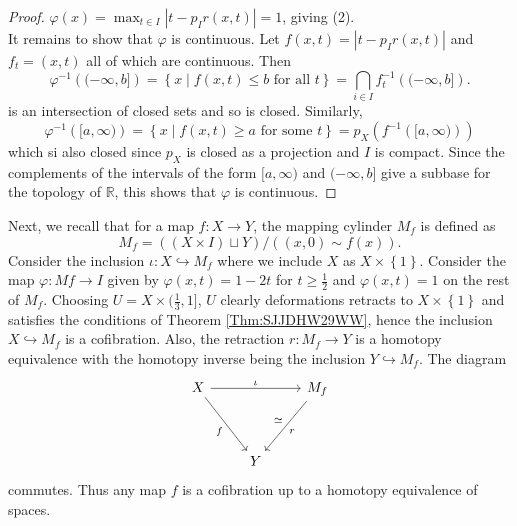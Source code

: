 \begin{proof}
    $\varphi (x) = 
    \max_{t \in I} \left| t - p_I r(x,t) \right| = 1$, giving
    (2).\\
    It remains to show that $\varphi $ is continuous.
    Let $f(x,t) = \left| t - p_I r(x,t) \right| $ and
    $f_t = (x,t)$ all of which are continuous.
    Then
    \[
        \varphi^{-1} \left( (- \infty, b] \right) 
        = \left\{ x  \mid f(x,t) \le b \text{ for all }t 
        \right\} = 
        \bigcap_{i \in  I} f_t^{-1}\left( (- \infty, b] \right) .
    \]
    is an intersection of closed sets and so is closed.
    Similarly,
    \[
    \varphi^{-1} \left( [a, \infty) \right) 
    = \left\{ x  \mid  f(x,t) \ge a \text{ for some }t \right\} 
    = p_X \left( f^{-1} \left( [a, \infty) \right)  \right) 
    \] 
    which si also closed since $p_X$ is closed as
    a projection and
    $I$ is compact.
    Since the complements of the intervals of the
    form $[a, \infty)$ and 
    $(-\infty, b]$ give a subbase for the topology of
    $\mathbb{R}$, this shows that
    $\varphi $ is continuous.





\end{proof}


Next, we recall that for a map
$f \colon X \to Y$, the mapping cylinder
$M_f$ is defined as
\[
M_f = \left( \left( X \times I \right) \sqcup Y \right) 
/ \left( \left( x,0 \right) \sim f(x) \right) .
\] 
Consider the inclusion
$\iota \colon X \hookrightarrow 
M_f$ where we include $X$ as
$X \times \left\{ 1 \right\} $.
Consider the map
$ \varphi \colon
M f \to I$ given by
$ \varphi (x,t)  =  1 - 2t$ for
$t \ge \frac{1}{2}$ and
$\varphi (x,t) = 1$ on the rest of $M_f$. Choosing
$U = X \times (\frac{1}{3}, 1]$, $U$ clearly
deformations retracts to $X \times \left\{ 1 \right\} $ and
satisfies the conditions of 
Theorem \ref{Thm:SJJDHW29WW}, hence
the inclusion $X \hookrightarrow M_f$ is a cofibration.
Also, the retraction
$r \colon M_f \to Y$ is a homotopy equivalence
with the homotopy inverse being the inclusion
$Y \hookrightarrow M_f$. The diagram
\begin{equation*}
\begin{tikzcd}
    X \ar[rr, "\iota"] \ar[ddr, "f"'] & & M_f \ar[ddl, "r", "\simeq"']\\ 
                                     &&\\
                                     & Y &
\end{tikzcd}
\end{equation*}
commutes.
Thus any map $f$ is a cofibration up to
a homotopy equivalence of spaces.

